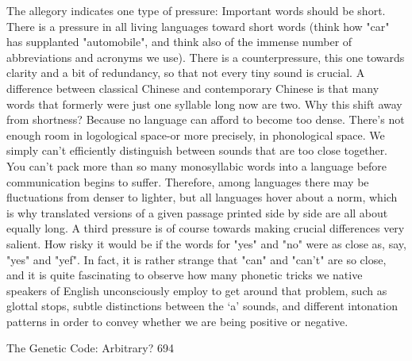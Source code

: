         The allegory indicates one type of pressure: Important words should be short.
There is a pressure in all living languages toward short words (think how "car" has
supplanted "automobile", and think also of the immense number of abbreviations and
acronyms we use). There is a counterpressure, this one towards clarity and a bit of
redundancy, so that not every tiny sound is crucial. A difference between classical
Chinese and contemporary Chinese is that many words that formerly were just one
syllable long now are two. Why this shift away from shortness? Because no language
can afford to become too dense. There's not enough room in logological space-or
more precisely, in phonological space. We simply can't efficiently distinguish
between sounds that are too close together. You can't pack more than so many
monosyllabic words into a language before communication begins to suffer.
Therefore, among languages there may be fluctuations from denser to lighter, but all
languages hover about a norm, which is why translated versions of a given passage
printed side by side are all about equally long. A third pressure is of course towards
making crucial differences very salient. How risky it would be if the words for "yes"
and "no" were as close as, say, "yes" and "yef". In fact, it is rather strange that "can"
and "can't" are so close, and it is quite fascinating to observe how many phonetic
tricks we native speakers of English unconsciously employ to get around that
problem, such as glottal stops, subtle distinctions between the `a' sounds, and different
intonation patterns in order to convey whether we are being positive or negative.




The Genetic Code: Arbitrary?                                                         694

